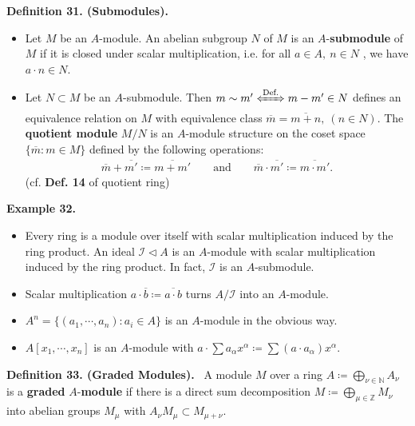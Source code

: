 \documentclass[12pt,a4paper,footinclude=true,headinclude=true]{scrbook} %
\newenvironment{definition}[2][Definition]
    { \begin{mdframed}[backgroundcolor=gray!20] \textbf{#1 #2.}\ }
    {  \end{mdframed}}
\newenvironment{example}[2][Example]
    { \begin{mdframed}[backgroundcolor=gray!20] \textbf{#1 #2.} }
    {  \end{mdframed}}
\begin{document}
\begin{definition}{31. (Submodules)}
    \begin{itemize}
        \item Let $M$ be an $A$-module. An abelian subgroup $N$ of $M$ is an $A$-\textbf{submodule} of $M$ if it is closed under scalar multiplication, i.e. for all $a\in A,\ n\in N$ , we have $a\cdot n\in N$.
        \item Let $N\subset M$ be an $A$-submodule. Then $m\sim m'\xLeftrightarrow{\text{Def.}} m-m'\in N$ defines an equivalence relation on $M$ with equivalence class $\overline{m} =\overline{m+n},\ (n\in N)$. The \textbf{quotient module} $M/N$ is an $A$-module structure on the coset space $\{\overline{m}:m\in M\}$ defined by the following operations:
        \begin{align*}
            \overline{m}+\overline{m'}\coloneqq\overline{m+m'}\qquad \text{and} \qquad \overline{m}\cdot\overline{m'}\coloneqq\overline{m\cdot m'}.
        \end{align*}
        (cf. \textbf{Def. 14} of quotient ring)
    \end{itemize}
\end{definition}
\newpage
\begin{example}{32}
    \begin{itemize}
        \item[(a)] Every ring is a module over itself with scalar multiplication induced by the ring product. An ideal $\mathcal{I}\triangleleft A$ is an $A$-module with scalar multiplication induced by the ring product. In fact, $\mathcal{I}$ is an $A$-submodule.
        \item[(b)] Scalar multiplication $a\cdot\overline{b}\coloneqq \overline{a\cdot b}$ turns $A/\mathcal{I}$ into an $A$-module.
        \item[(c)] $A^n=\{(a_1,\cdots,a_n):a_i\in A\}$ is an $A$-module in the obvious way.
        \item[(d)] $A[x_1,\cdots,x_n]$ is an $A$-module with $a\cdot \sum a_\alpha x^\alpha\coloneqq\sum(a\cdot a_\alpha)x^\alpha$.
    \end{itemize}
\end{example}

\begin{definition}{33. (Graded Modules)}
    A module $M$ over a ring $A\coloneqq\bigoplus_{\nu\in\mathbb{N}}A_\nu$ is a \textbf{graded} $A$-\textbf{module} if there is a direct sum decomposition $M\coloneqq\bigoplus_{\mu\in\mathbb{Z}}M_\nu$ into abelian groups $M_\mu$ with $A_\nu M_\mu\subset M_{\mu+\nu}$.
\end{definition}
\end{document}
